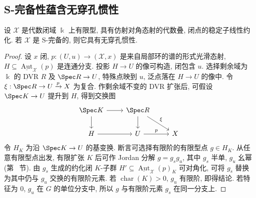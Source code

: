 \subsection{S-完备性蕴含无穿孔惯性}\label{src:7.10.5-subsection}
\begin{theorem}\label{src:7.10.23}
设 $\mathcal X$ 是代数闭域 $\Bbbk$ 上有限型, 具有仿射对角态射的代数叠, 闭点的稳定子线性约化. 若 $\mathcal X$ 是 S-完备的, 则它具有无穿孔惯性.
\end{theorem}
\begin{proof}
设 $x$ 闭, $p:(U,u)\to(\mathcal X,x)$ 是来自局部环的谱的形式光滑态射, $H\subseteq\underline{\operatorname{Aut}}_{\mathcal X}(p)$ 是连通分支. 投影 $H\to U$ 的像可构造, 闭包含 $u$. 选择剩余域为 $\Bbbk$ 的 DVR $R$ 及 $\Spec R\to U$, 特殊点映到 $u$, 泛点落在 $H\to U$ 的像中. 令 $\xi:\Spec R\to U\xrightarrow{p}\mathcal X$ 为复合. 作剩余域不变的 DVR 扩张后, 可假设 $\Spec K\to U$ 提升到 $H$, 得到交换图
\[\begin{tikzcd}[ampersand replacement=\&]\Spec K\arrow[r]\arrow[d]\&\Spec R\arrow[d]\arrow[dr,"{\xi}"]\&\\H\arrow[r]\&U\arrow[r,"{p}"]\&\mathcal X\end{tikzcd}\]
令 $H_K$ 为沿 $\Spec K\to U$ 的基变换. 断言可选择有限阶的有限型点 $g\in H_K$. 从任意有限型点出发, 有限扩张 $K$ 后可作 Jordan 分解 $g=g_sg_u$, 其中 $g_s$ 半单, $g_u$ 幺幂 (第~ 节). 由 $g_s$ 生成的约化闭 $K$-子群 $H'\subseteq\underline{\operatorname{Aut}}_{\mathcal X}(p)_K$ 可对角化, 可将 $g_s$ 替换为其中仍与 $g_u$ 交换的有限阶元素. 若 $\operatorname{char}(K)>0$, $g_u$ 有限阶, 即得结论. 若特征为 $0$, $g_u$ 在 $G$ 的单位分支中, 所以 $g$ 与有限阶元素 $g_s$ 在同一分支上.


\end{proof}
